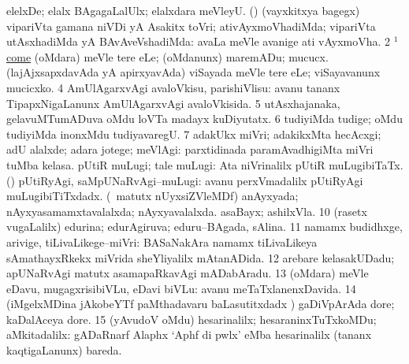 \noindent
\gl{\pagu}
\bmng
\bnum
{}  
\banum
{} elelxDe; elalx BAgagaLalUlx; elalxdara meVleyU. 
 (\ashi) (vayxkitxya bagegx) vipariVta gamana niVDi yA Asakitx toVri; ativAyxmoVhadiMda; vipariVta utAsxhadiMda yA BAvAveVshadiMda:  avaLa meVle avanige ati vAyxmoVha. 
\eanum
\numie
\num{2} \hyperref{kandict_c.pdf}{C}{come(1) nuga(36)}{$^1$come}  
  
\banum
{} (oMdara) meVle tere eLe; (oMdanunx) maremADu; mucucx. 
 (lajAjxsapxdavAda yA apirxyavAda) viSayada meVle tere eLe; viSayavanunx mucicxko. 
\eanum
\numie
\num{4}  AmUlAgarxvAgi avaloVkisu, parishiVlisu:  avanu tananx TipapxNigaLanunx AmUlAgarxvAgi avaloVkisida. 
\num{5}  utAsxhajanaka, gelavuMTumADuva oMdu loVTa madayx kuDiyutatx. 
\num{6}  tudiyiMda tudige; oMdu tudiyiMda inonxMdu tudiyavaregU. 
\num{7}  adakUkx miVri; adakikxMta hecAcxgi; adU alalxde; adara jotege; meVlAgi:  parxtidinada paramAvadhigiMta miVri tuMba kelasa. 
  
\banum
{} pUtiR muLugi; tale muLugi:  Ata niVrinalilx pUtiR muLugibiTaTx. 
 (\rUpa) pUtiRyAgi, saMpUNaRvAgi--muLugi:  avanu perxVmadalilx pUtiRyAgi muLugibiTiTxdadx. 
\eanum
\numie
{}  (\AseTxrXV\ matutx nUyxsiZVleMDf) 
\banum
{} anAyxyada; nAyxyasamamxtavalalxda; nAyxyavalalxda. 
 asaBayx; ashilxVla. 
\eanum
\numie
\num{10}  (rasetx \mo vugaLalilx) edurina; edurAgiruva; eduru--BAgada, sAlina. 
\num{11}  namamx budidhxge, arivige, tiLivaLikege--miVri:  BASaNakAra namamx tiLivaLikeya sAmathayxRkekx miVrida sheYliyalilx mAtanADida. 
\num{12}  arebare kelasakUDadu; apUNaRvAgi matutx asamapaRkavAgi mADabAradu. 
\num{13}  (oMdara) meVle eDavu, mugagxrisibiVLu, eDavi biVLu:  avanu meTaTxlanenxDavida. 
\num{14}  (iMgelxMDina jAkobeYTf paMthadavaru baLasutitxdadx \nuga) gaDiVpArAda dore; kaDalAceya dore. 
\num{15}  (yAvudoV oMdu) hesarinalilx; hesaraninxTuTxkoMDu; aMkitadalilx:  gADaRnarf Alaphx `Aphf di pwlx' eMba hesarinalilx (tananx kaqtigaLanunx) bareda. 
\enum
\emng
\eentry

